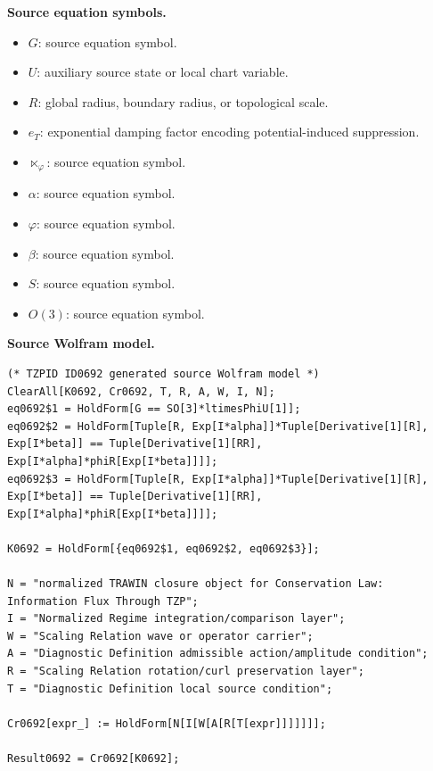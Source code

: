 \begin{minipage}[t]{0.49\linewidth}
\begingroup
\small
\raggedright
\textbf{Source equation symbols.}\par
\begin{itemize}[leftmargin=1.35em,itemsep=1pt,topsep=1pt,parsep=0pt]
    \item $G$: source equation symbol.
    \item $U$: auxiliary source state or local chart variable.
    \item $R$: global radius, boundary radius, or topological scale.
    \item $e_T$: exponential damping factor encoding potential-induced suppression.
    \item $\ltimes_{\varphi}$: source equation symbol.
    \item $\alpha$: source equation symbol.
    \item $\varphi$: source equation symbol.
    \item $\beta$: source equation symbol.
    \item $S$: source equation symbol.
    \item $O(3)$: source equation symbol.
\end{itemize}
\endgroup
\end{minipage}\hfill
\begin{minipage}[t]{0.47\linewidth}
\begingroup
\scriptsize
\raggedright
\textbf{Source Wolfram model.}\par
\begin{Verbatim}[fontsize=\tiny,breaklines=true,breakanywhere=true]
(* TZPID ID0692 generated source Wolfram model *)
ClearAll[K0692, Cr0692, T, R, A, W, I, N];
eq0692$1 = HoldForm[G == SO[3]*ltimesPhiU[1]];
eq0692$2 = HoldForm[Tuple[R, Exp[I*alpha]]*Tuple[Derivative[1][R], Exp[I*beta]] == Tuple[Derivative[1][RR], Exp[I*alpha]*phiR[Exp[I*beta]]]];
eq0692$3 = HoldForm[Tuple[R, Exp[I*alpha]]*Tuple[Derivative[1][R], Exp[I*beta]] == Tuple[Derivative[1][RR], Exp[I*alpha]*phiR[Exp[I*beta]]]];

K0692 = HoldForm[{eq0692$1, eq0692$2, eq0692$3}];

N = "normalized TRAWIN closure object for Conservation Law: Information Flux Through TZP";
I = "Normalized Regime integration/comparison layer";
W = "Scaling Relation wave or operator carrier";
A = "Diagnostic Definition admissible action/amplitude condition";
R = "Scaling Relation rotation/curl preservation layer";
T = "Diagnostic Definition local source condition";

Cr0692[expr_] := HoldForm[N[I[W[A[R[T[expr]]]]]]];

Result0692 = Cr0692[K0692];
\end{Verbatim}
\endgroup
\end{minipage}

